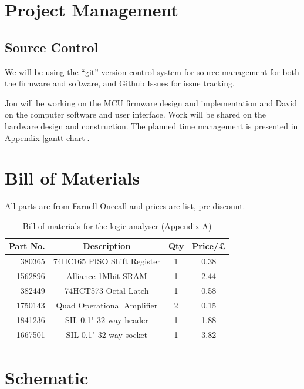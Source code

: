 \documentclass[11pt]{article}
\begin{document}
\section{Project Management}
\subsection{Source Control}
    We will be using the ``git'' version control system for source management for both the firmware and software, and Github Issues for issue tracking.

    Jon will be working on the MCU firmware design and implementation and David on the computer software and user interface. Work will be shared on the hardware design and construction.  The planned time management is presented in Appendix \ref{gantt-chart}.
	
\appendix
\appendixpage
\addappheadtotoc

\section{Bill of Materials}
    All parts are from Farnell Onecall and prices are list, pre-discount.

    \begin{table}
    \begin{center}
    \begin{tabular}{|r|c|c|c|}
        \hline \textbf{Part No.} & \textbf{Description} & \textbf{Qty} & \textbf{Price/£ }  \\
        \hline 380365 & 74HC165 PISO Shift Register & 1 & 0.38 \\
        \hline 1562896 & Alliance 1Mbit SRAM & 1 & 2.44 \\
         \hline 382449 & 74HCT573 Octal Latch & 1 & 0.58 \\
        \hline 1750143 & Quad Operational Amplifier & 2 & 0.15 \\
        \hline 1841236 & SIL 0.1" 32-way header & 1 & 1.88 \\
        \hline 1667501 & SIL 0.1" 32-way socket & 1 & 3.82 \\
        \hline
    \end{tabular}
    \end{center}
    \caption{Bill of materials for the logic analyser (Appendix A)}
    \label{fig:myt}
    \end{table}

\section{Schematic}
\label{app-schematic}
			
\end{document}
